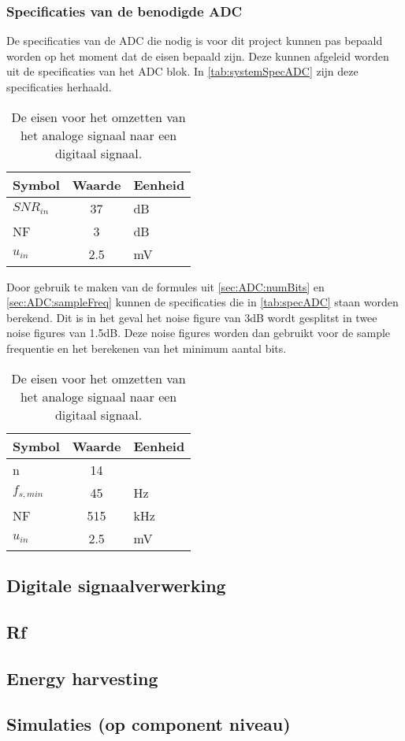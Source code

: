 \subsubsection{Specificaties van de benodigde ADC}
De specificaties van de ADC die nodig is voor dit project kunnen pas bepaald worden op het moment dat de eisen bepaald zijn. Deze kunnen afgeleid worden uit de specificaties van het ADC blok. In \autoref{tab:systemSpecADC} zijn deze specificaties herhaald.
\begin{table}[ht]
    \centering
    \begin{tabular}{l|c|l}
        Symbol      & Waarde & Eenheid\\\hline
        $SNR_{in}$  & 37        & dB\\
        NF          & 3         & dB\\
        $u_{in}$    & 2.5       & mV\\
    \end{tabular}
    \caption{De eisen voor het omzetten van het analoge signaal naar een digitaal signaal.}
    \label{tab:systemSpecADC}
\end{table}
Door gebruik te maken van de formules uit \autoref{sec:ADC:numBits} en \autoref{sec:ADC:sampleFreq} kunnen de specificaties die in \autoref{tab:specADC} staan worden berekend. Dit is in het geval het noise figure van 3dB wordt gesplitst in twee noise figures van 1.5dB. Deze noise figures worden dan gebruikt voor de sample frequentie en het berekenen van het minimum aantal bits.
\begin{table}[ht]
    \centering
    \begin{tabular}{l|c|l}
        Symbol      & Waarde    & Eenheid\\\hline
        n           & 14        & \\
        $f_{s,min}$ & 45        & Hz\\
        NF          & 515       & kHz\\
        $u_{in}$    & 2.5       & mV\\
    \end{tabular}
    \caption{De eisen voor het omzetten van het analoge signaal naar een digitaal signaal.}
    \label{tab:specADC}
\end{table}





\subsection{Digitale signaalverwerking}

\subsection{Rf}

\subsection{Energy harvesting}

\subsection{Simulaties (op component niveau)}
